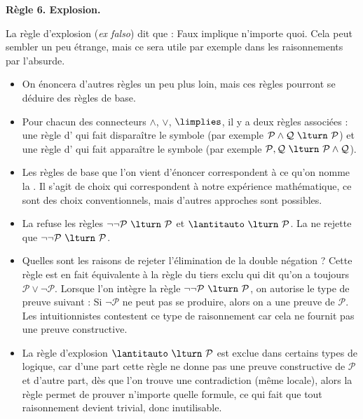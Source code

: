 \documentclass[11pt,class=report,crop=false]{standalone}
\begin{document}
\bigskip
\textbf{Règle 6. Explosion.}

La règle d'explosion (\emph{ex falso}) dit que : \og{}Faux implique n'importe quoi.\fg{}
Cela peut sembler un peu étrange, mais ce sera utile par exemple dans les raisonnements par l'absurde.


\bigskip

\begin{remarque*}
	\sauteligne
\begin{itemize}
	\item On énoncera d'autres règles un peu plus loin, mais ces règles pourront se déduire des règles de base.
	
	\item Pour chacun des connecteurs $\land$, $\lor$, $\limplies$, il y a deux règles associées : une règle d' qui fait disparaître le symbole (par exemple
	$\mathcal{P} \land \mathcal{Q} \  \lturn \ \mathcal{P}$) et une règle d'
	qui fait apparaître le symbole (par exemple $\mathcal{P}, \mathcal{Q} \ \lturn \  \mathcal{P} \land \mathcal{Q}$).
	
	\item Les règles de base que l'on vient d'énoncer correspondent à ce qu'on nomme la . Il s'agit de choix qui correspondent à notre expérience mathématique, ce sont des choix conventionnels, mais d'autres approches sont possibles.
	
	\item La  refuse les règles $\lnot\lnot \mathcal{P} \ \lturn \  \mathcal{P}$ et $\lantitauto \ \lturn \ \mathcal{P}$.
	La  ne rejette que $\lnot\lnot \mathcal{P} \ \lturn \ \mathcal{P}$.
	
	\item Quelles sont les raisons de rejeter l'élimination de la double négation ? Cette règle est en fait équivalente à la règle du tiers exclu qui dit qu'on a toujours $\mathcal{P} \lor \lnot \mathcal{P}$. Lorsque l'on intègre la règle $\lnot\lnot \mathcal{P} \ \lturn \ \mathcal{P}$, on autorise le type de preuve suivant : \og{}Si $\lnot \mathcal{P}$ ne peut pas se produire, alors on a une preuve de $\mathcal{P}$.\fg{} Les intuitionnistes contestent ce type de raisonnement car cela ne fournit pas une preuve constructive.
	
	\item La règle d'explosion $\lantitauto \ \lturn \ \mathcal{P}$ est exclue dans certains types de logique, car d'une part cette règle ne donne pas une preuve constructive de $\mathcal{P}$ et d'autre part, dès que l'on trouve une contradiction (même locale), alors la règle permet de prouver n'importe quelle formule, ce qui fait que tout raisonnement devient trivial, donc inutilisable.	
\end{itemize}
\end{remarque*}
\end{document}

